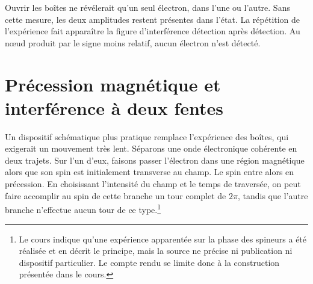\begin{classroomqa}
\end{classroomqa}

Ouvrir les boîtes ne révélerait qu’un seul électron, dans l’une ou l’autre. Sans cette mesure, les deux amplitudes restent présentes dans l’état. La répétition de l’expérience fait apparaître la figure d’interférence détection après détection. Au nœud produit par le signe moins relatif, aucun électron n’est détecté.

\section{Précession magnétique et interférence à deux fentes}

Un dispositif schématique plus pratique remplace l’expérience des boîtes, qui exigerait un mouvement très lent. Séparons une onde électronique cohérente en deux trajets. Sur l’un d’eux, faisons passer l’électron dans une région magnétique alors que son spin est initialement transverse au champ. Le spin entre alors en précession. En choisissant l’intensité du champ et le temps de traversée, on peut faire accomplir au spin de cette branche un tour complet de \(2\pi\), tandis que l’autre branche n’effectue aucun tour de ce type.\footnote{Le cours indique qu’une expérience apparentée sur la phase des spineurs a été réalisée et en décrit le principe, mais la source ne précise ni publication ni dispositif particulier. Le compte rendu se limite donc à la construction présentée dans le cours.}

\begin{classroomqa}
\end{classroomqa}

\begin{classroomqa}
\end{classroomqa}

